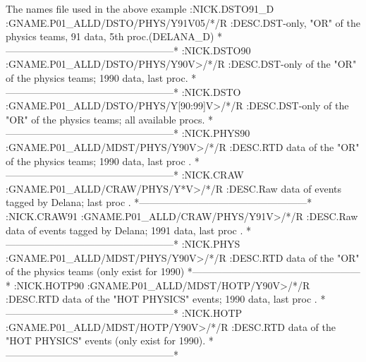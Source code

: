 \begin{XMPt}{The names file used in the above example}
:NICK.DSTO91_D                                                          
:GNAME.P01_ALLD/DSTO/PHYS/Y91V05/*/R                                    
:DESC.DST-only, "OR" of the physics teams, 91 data, 5th proc.(DELANA_D) 
*---------------------------------------------------*                   
:NICK.DSTO90                                                            
:GNAME.P01_ALLD/DSTO/PHYS/Y90V>/*/R                                     
:DESC.DST-only of the "OR" of the physics teams; 1990 data, last proc.  
*---------------------------------------------------*                   
:NICK.DSTO                                                              
:GNAME.P01_ALLD/DSTO/PHYS/Y[90:99]V>/*/R                                
:DESC.DST-only of the "OR" of the physics teams; all available procs.   
*---------------------------------------------------*                   
:NICK.PHYS90                                                            
:GNAME.P01_ALLD/MDST/PHYS/Y90V>/*/R                                     
:DESC.RTD data of the "OR" of the physics teams; 1990 data, last proc . 
*---------------------------------------------------*                   
:NICK.CRAW                                                              
:GNAME.P01_ALLD/CRAW/PHYS/Y*V>/*/R                                      
:DESC.Raw data of events tagged by Delana; last proc .                  
*---------------------------------------------------*                   
:NICK.CRAW91                                                            
:GNAME.P01_ALLD/CRAW/PHYS/Y91V>/*/R                                     
:DESC.Raw data of events tagged by Delana; 1991 data, last proc .       
*---------------------------------------------------*                   
:NICK.PHYS                                                              
:GNAME.P01_ALLD/MDST/PHYS/Y90V>/*/R                                     
:DESC.RTD data of the "OR" of the physics teams (only exist for 1990)   
*---------------------------------------------------*                   
:NICK.HOTP90                                                            
:GNAME.P01_ALLD/MDST/HOTP/Y90V>/*/R                                     
:DESC.RTD data of the "HOT PHYSICS" events; 1990 data, last proc .      
*---------------------------------------------------*                   
:NICK.HOTP                                                              
:GNAME.P01_ALLD/MDST/HOTP/Y90V>/*/R                                     
:DESC.RTD data of the "HOT PHYSICS" events (only exist for 1990).       
*---------------------------------------------------*                   

\end{XMPt}
